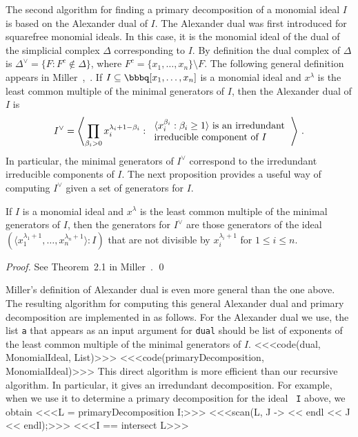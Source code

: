 The second algorithm for finding a primary decomposition of a monomial
ideal $I$ is based on the Alexander dual of $I$.  The Alexander dual was first
introduced for squarefree monomial ideals.  In this case, it is the
monomial ideal of the dual of the simplicial complex $\Delta$
corresponding to $I$.  By definition the dual complex of $\Delta$ is
$\Delta^{\vee} = \{ F : F^{c} \not\in \Delta \}$, where $F^{c} =
\{x_{1}, \dotsc, x_{n}\} \setminus F$.  The following general
definition appears in Miller~\cite{M},~\cite{MR1779598}.  If
$I \subseteq \bbbq[x_{1},
\dotsc, x_{n}]$ is a monomial ideal and $x^{\lambda}$ is the least
common multiple of the minimal generators of $I$, then the Alexander
dual of $I$ is
\[
I^{\vee} = \left\langle \prod_{\beta_{i} > 0}
x_{i}^{\lambda_{i}+1-\beta_{i}} : \begin{tabular}{l} \text{$\langle
x_{i}^{\beta_{i}} : \beta_{i} \geq 1\rangle$ is an
irredundant} \\ \text{irreducible component of $I$} \end{tabular}
\right\rangle \, .
\]
In particular, the minimal generators of $I^{\vee}$ correspond to the
irredundant irreducible components of $I$.  The next proposition
provides a useful way of computing $I^{\vee}$ given a set of
generators for $I$.

\begin{proposition}  
If $I$ is a monomial ideal and $x^{\lambda}$ is the least common
multiple of the minimal generators of $I$, then the generators for
$I^{\vee}$ are those generators of the ideal $\left( \langle
x_{1}^{\lambda_{1}+1}, \dotsc, x_{n}^{\lambda_{n}+1} \rangle : I
\right)$ that are not divisible by $x_{i}^{\lambda_{i}+1}$ for $1 \leq
i \leq n$.
\end{proposition}

\begin{proof}
See Theorem~2.1 in Miller~\cite{M}. \qed
\end{proof}

Miller's definition of Alexander dual is even more general than the one
above. The resulting algorithm for computing this general Alexander
dual and primary decomposition are implemented in \Mtwo as follows. 
For the Alexander dual we use, the list {\tt a} that appears
as an input argument for {\tt dual} should be list of exponents of
the least common multiple of the minimal generators of $I$.
<<<code(dual, MonomialIdeal, List)>>>
<<<code(primaryDecomposition, MonomialIdeal)>>>
This direct algorithm is more efficient than our recursive algorithm.
In particular, it gives an irredundant decomposition.  For example,
when we use it to determine a primary decomposition for the ideal {\tt
I} above, we obtain
<<<L = primaryDecomposition I;>>>
<<<scan(L, J -> << endl << J << endl);>>>
<<<I == intersect L>>>

